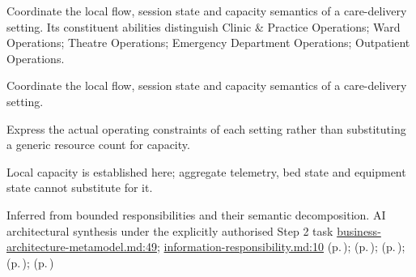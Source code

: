 Coordinate the local flow, session state and capacity semantics of a care-delivery setting. Its constituent abilities distinguish Clinic \& Practice Operations; Ward Operations; Theatre Operations; Emergency Department Operations; Outpatient Operations.



Coordinate the local flow, session state and capacity semantics of a care-delivery setting.



Express the actual operating constraints of each setting rather than substituting a generic resource count for capacity.



Local capacity is established here; aggregate telemetry, bed state and equipment state cannot substitute for it.


Inferred from bounded responsibilities and their semantic decomposition. AI architectural synthesis under the explicitly authorised Step 2 task \hyperref[evidence:4bac85accd34ce0b]{business-architecture-metamodel.md:49}; \hyperref[evidence:be61392fefb4bb10]{information-responsibility.md:10}
 (p.\,\pageref{cap:bec-clinic-practice-operations});  (p.\,\pageref{cap:bec-ward-operations});  (p.\,\pageref{cap:bec-theatre-operations});  (p.\,\pageref{cap:bec-emergency-department-operations});  (p.\,\pageref{cap:bec-outpatient-operations})
